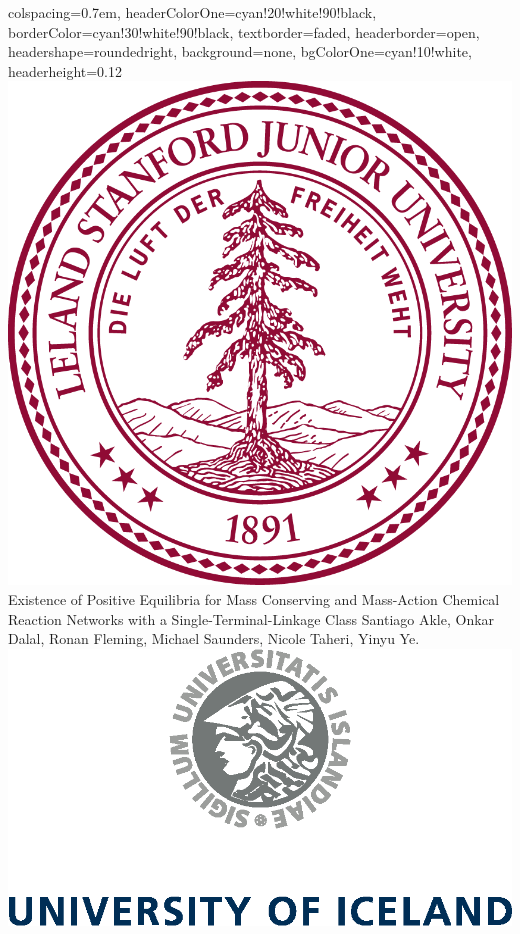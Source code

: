 \documentclass[landscape]{baposter}
\newcommand*{\0}{\mathbf{0}}
\newcommand*{\1}{\mathbf{1}}
\begin{document}
\begin{poster}
  {
	colspacing=0.7em,
	headerColorOne=cyan!20!white!90!black,
	borderColor=cyan!30!white!90!black,
 	textborder=faded,
	headerborder=open, headershape=roundedright, background=none,
	bgColorOne=cyan!10!white, headerheight=0.12\textheight}
   {
      \includegraphics[height=0.12\textheight]{./images/SU_Seal_red.png}\\
   }
  {
  Existence of Positive Equilibria for Mass Conserving and Mass-Action
	Chemical Reaction Networks with a 
	Single-Terminal-Linkage Class
  }
  {
 \vskip 2pt
  Santiago Akle,
   Onkar Dalal,
   Ronan Fleming, 
   Michael Saunders,
   Nicole Taheri,
   Yinyu Ye.
   }
   {
      \includegraphics[height=0.12\textheight]{./images/ui_1_rgb.eps}\\
}
\end{poster}
\end{document}

